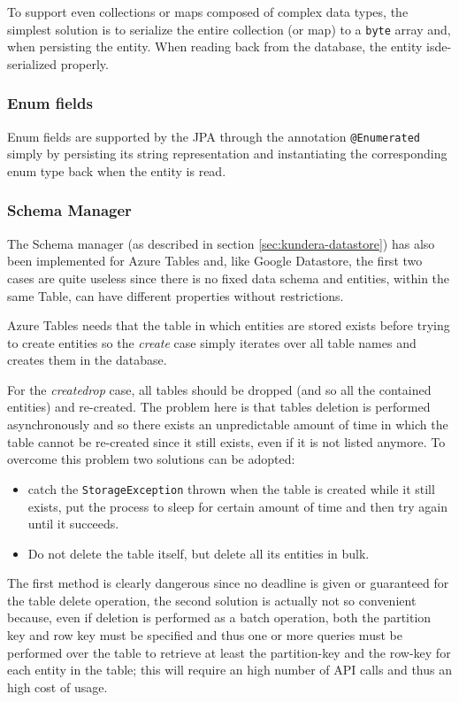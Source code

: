 \noindent To support even collections or maps composed of complex data types, the simplest solution is to serialize the entire collection (or map) to a \texttt{byte} array and, when persisting the entity. When reading back from the database, the entity isde-serialized properly.

\subsubsection{Enum fields}
Enum fields are supported by the JPA through the annotation \texttt{@Enumerated}  simply by persisting its string representation and instantiating the corresponding enum type back when the entity is read.

\subsubsection{Schema Manager}
The Schema manager (as described in section \ref{sec:kundera-datastore}) has also been implemented for Azure Tables and, like Google Datastore, the first two cases are quite useless since there is no fixed data schema and entities, within the same Table, can have different properties without restrictions.

\noindent Azure Tables needs that the table in which entities are stored exists before trying to create entities so the \textit{create} case simply iterates over all table names and creates them in the database. 

\noindent For the \textit{create\textunderscore drop} case, all tables should be dropped (and so all the contained entities) and re-created. The problem here is that tables deletion is performed asynchronously and so there exists an unpredictable amount of time in which the table cannot be re-created since it still exists, even if it is not listed anymore.
\noindent To overcome this problem two solutions can be adopted:
\begin{itemize}
\item catch the \texttt{StorageException} thrown when the table is created while it still exists, put the process to sleep for certain amount of time and then try again until it succeeds.
\item Do not delete the table itself, but delete all its entities in bulk.
\end{itemize}

\noindent The first method is clearly dangerous since no deadline is given or guaranteed for the table delete operation, the second solution is actually not so convenient because, even if deletion is performed as a batch operation, both the partition key and row key must be specified and thus one or more queries must be performed over the table to retrieve at least the partition-key and the row-key for each entity in the table; this will require an high number of API calls and thus an high cost of usage.

